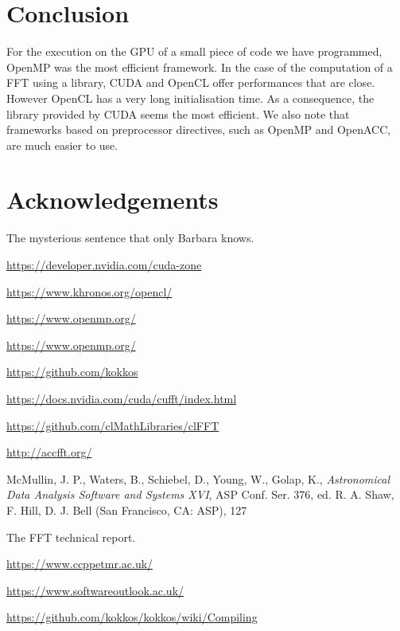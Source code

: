 \documentclass[12pt, a4paper]{article}
\begin{document}
\section{Conclusion}
For the execution on the GPU of a small piece of code we have programmed, OpenMP was the most efficient framework. In the case of the computation of a FFT using a library, CUDA and OpenCL offer performances that are close. However OpenCL has a very long initialisation time. As a consequence, the library provided by CUDA seems the most efficient. We also note that frameworks based on preprocessor directives, such as OpenMP and OpenACC, are much easier to use. 

\section{Acknowledgements}
The mysterious sentence that only Barbara knows.

\begin{thebibliography}{9}

\hyperlink{https://developer.nvidia.com/cuda-zone}{https://developer.nvidia.com/cuda-zone}

\hyperlink{https://www.khronos.org/opencl/}{https://www.khronos.org/opencl/}

\hyperlink{https://www.openmp.org/}{https://www.openmp.org/}
  
\hyperlink{https://www.openmp.org/}{https://www.openmp.org/}

\hyperlink{https://github.com/kokkos}{https://github.com/kokkos}

\hyperlink{https://docs.nvidia.com/cuda/cufft/index.html}{https://docs.nvidia.com/cuda/cufft/index.html}

  \hyperlink{https://github.com/clMathLibraries/clFFT}{https://github.com/clMathLibraries/clFFT}
  
\hyperlink{http://accfft.org/}{http://accfft.org/}

McMullin, J. P., Waters, B., Schiebel, D., Young, W., Golap, K.,
{\it Astronomical Data Analysis Software and Systems XVI},
ASP Conf. Ser. 376, ed. R. A. Shaw, F. Hill, D. J. Bell (San Francisco, CA: ASP), 127

The FFT technical report.

\hyperlink{https://www.ccppetmr.ac.uk/}{https://www.ccppetmr.ac.uk/}

\hyperlink{https://www.softwareoutlook.ac.uk/}{https://www.softwareoutlook.ac.uk/}

\hyperlink{https://github.com/kokkos/kokkos/wiki/Compiling}{https://github.com/kokkos/kokkos/wiki/Compiling}

\end{thebibliography}
\end{document}
